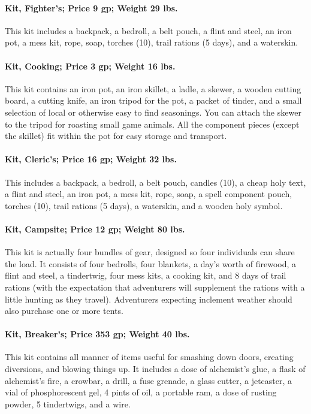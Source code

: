 \begin{multicols}{2}
\paragraph{Kit, Fighter's; Price 9 gp; Weight 29 lbs.}
This kit includes a backpack, a bedroll, a belt pouch, a flint and steel, an iron pot, a mess kit, rope, soap, torches (10), trail rations (5 days), and a waterskin.

\paragraph{Kit, Cooking; Price 3 gp; Weight 16 lbs.}
This kit contains an iron pot, an iron skillet, a ladle, a skewer, a wooden cutting board, a cutting knife, an iron tripod for the pot, a packet of tinder, and a small selection of local or otherwise easy to find seasonings. You can attach the skewer to the tripod for roasting small game animals. All the component pieces (except the skillet) fit within the pot for easy storage and transport.

\paragraph{Kit, Cleric's; Price 16 gp; Weight 32 lbs.}
This includes a backpack, a bedroll, a belt pouch, candles (10), a cheap holy text, a flint and steel, an iron pot, a mess kit, rope, soap, a spell component pouch, torches (10), trail rations (5 days), a waterskin, and a wooden holy symbol.

\paragraph{Kit, Campsite; Price 12 gp; Weight 80 lbs.}
This kit is actually four bundles of gear, designed so four individuals can share the load. It consists of four bedrolls, four blankets, a day's worth of firewood, a flint and steel, a tindertwig, four mess kits, a cooking kit, and 8 days of trail rations (with the expectation that adventurers will supplement the rations with a little hunting as they travel). Adventurers expecting inclement weather should also purchase one or more tents.

\paragraph{Kit, Breaker's; Price 353 gp; Weight 40 lbs.}
This kit contains all manner of items useful for smashing down doors, creating diversions, and blowing things up. It includes a dose of alchemist's glue, a flask of alchemist's fire, a crowbar, a drill, a fuse grenade, a glass cutter, a jetcaster, a vial of phosphorescent gel, 4 pints of oil, a portable ram, a dose of rusting powder, 5 tindertwigs, and a wire.


\end{multicols}
